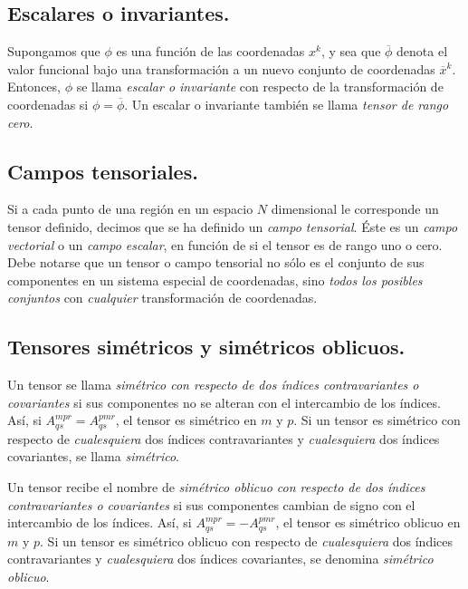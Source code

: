 \subsection*{Escalares o invariantes.}

Supongamos que $\phi$ es una función de las coordenadas $x^{k}$, y sea que $\overline{\phi}$ denota el valor funcional bajo una transformación a un nuevo conjunto de coordenadas $\overline{x}^{k}$. Entonces, $\phi$ se llama \emph{escalar o invariante} con respecto de la transformación de coordenadas si $\phi = \overline{\phi}$. Un escalar o invariante también se llama \emph{tensor de rango cero}.

\subsection*{Campos tensoriales.}

Si a cada punto de una región en un espacio $N$ dimensional le corresponde un tensor definido, decimos que se ha definido un \emph{campo tensorial}. Éste es un \emph{campo vectorial} o un \emph{campo escalar}, en función de si el tensor es de rango uno o cero. Debe notarse que un tensor o campo tensorial no sólo es el conjunto de sus componentes en un sistema especial de coordenadas, sino \emph{todos los posibles conjuntos} con \emph{cualquier} transformación de coordenadas.

\subsection*{Tensores simétricos y simétricos oblicuos.}

Un tensor se llama \emph{simétrico con respecto de dos índices contravariantes o covariantes} si sus componentes no se alteran con el intercambio de los índices. Así, si $A_{qs}^{mpr} = A_{qs}^{pmr}$, el tensor es simétrico en $m$ y $p$. Si un tensor es simétrico con respecto de \emph{cualesquiera} dos índices contravariantes y \emph{cualesquiera} dos índices covariantes, se llama \emph{simétrico}.
\par
Un tensor recibe el nombre de \emph{simétrico oblicuo con respecto de dos índices contravariantes o covariantes} si sus
componentes cambian de signo con el intercambio de los índices. Así, si $A_{qs}^{mpr} = -A_{qs}^{pmr}$, el tensor es simétrico oblicuo en $m$ y $p$. Si un tensor es simétrico oblicuo con respecto de \emph{cualesquiera} dos índices contravariantes y \emph{cualesquiera} dos índices covariantes, se denomina \emph{simétrico oblicuo}.

